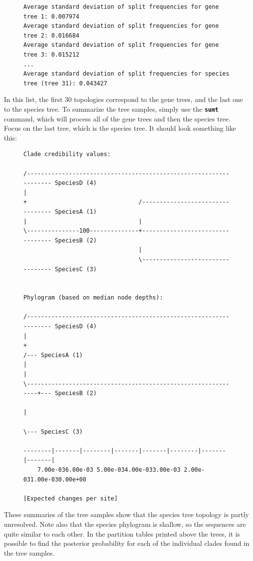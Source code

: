 \documentclass[12pt]{book}
\newcommand{\ttt}[1]{\texttt{#1}}
\newcommand{\tb}[1]{\ttt{\textbf{#1}}}
\begin{document}
\begin{figure}[h]
\centering
\begin{BVerbatim}
Average standard deviation of split frequencies for gene tree 1: 0.007974
Average standard deviation of split frequencies for gene tree 2: 0.016684
Average standard deviation of split frequencies for gene tree 3: 0.015212
...
Average standard deviation of split frequencies for species tree (tree 31): 0.043427
\end{BVerbatim}
\end{figure}

In this list, the first 30 topologies correspond to the gene trees, and the last one to the species
tree. To summarize the tree samples, simply use the \tb{sumt} command, which will process all of
the gene trees and then the species tree. Focus on the last tree, which is the species tree. It
should look something like this:

\begin{figure}[h]
\centering
\begin{BVerbatim}[fontsize=\scriptsize]
Clade credibility values:

/------------------------------------------------------------------ SpeciesD (4)
|
+                                /--------------------------------- SpeciesA (1)
|                                |
\---------------100--------------+--------------------------------- SpeciesB (2)
                                 |
                                 \--------------------------------- SpeciesC (3)


Phylogram (based on median node depths):

/------------------------------------------------------------------ SpeciesD (4)
|
+                                                              /--- SpeciesA (1)
|                                                              |
\--------------------------------------------------------------+--- SpeciesB (2)
                                                               |
                                                               \--- SpeciesC (3)

--------|-------|--------|-------|-------|--------|-------|-------|
    7.00e-036.00e-03 5.00e-034.00e-033.00e-03 2.00e-031.00e-030.00e+00

[Expected changes per site]

\end{BVerbatim}
\end{figure}

These summaries of the tree samples show that the species tree topology is partly unresolved. Note
also that the species phylogram is shallow, so the sequences are quite similar to each other. In
the partition tables printed above the trees, it is possible to find the posterior probability for
each of the individual clades found in the tree samples.
\end{document}
